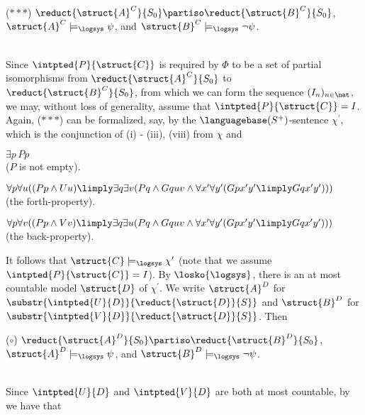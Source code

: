 \begin{enumerate}[1.]
\smallskip\\
\begin{quoteno}{($\ast\ast\ast$)}
$\reduct{\struct{A}^C}{S_0} \partiso \reduct{\struct{B}^C}{S_0}$, $\struct{A}^C \models_\logsys \psi$, and $\struct{B}^C \models_\logsys \neg\psi$.
\end{quoteno}\smallskip\\
Since $\intpted{P}{\struct{C}}$ is required by $\Phi$ to be a set of partial isomorphisms from $\reduct{\struct{A}^C}{S_0}$ to $\reduct{\struct{B}^C}{S_0}$, from which we can form the sequence $(I_n)_{n \in \nat}$, we may, without loss of generality, assume that $\intpted{P}{\struct{C}} = I$.
\bigskip\\
Again, ($\ast\ast\ast$) can be formalized, say, by the $\languagebase(S^+)$-sentence $\chi^\prime$, which is the conjunction of (i) - (iii), (viii) from $\chi$ and
\begin{compactenum}[(i$^\prime$)]
\item $\exists p \, Pp$\\($P$ is not empty).
\item $\forall p \forall u ((Pp \land Uu) \limply \exists q \exists v (Pq \land Gquv \land \forall x^\prime \forall y^\prime (Gpx^\prime y^\prime \limply Gqx^\prime y^\prime)))$\\(the forth-property).
\item $\forall p \forall v ((Pp \land Vv) \limply \exists q \exists u (Pq \land Gquv \land \forall x^\prime \forall y^\prime (Gpx^\prime y^\prime \limply Gqx^\prime y^\prime)))$\\(the back-property).
\end{compactenum}
It follows that $\struct{C} \models_\logsys \chi^\prime$ (note that we assume $\intpted{P}{\struct{C}} = I$). By $\losko{\logsys}$, there is an at most countable model $\struct{D}$ of $\chi^\prime$. We write $\struct{A}^D$ for $\substr{\intpted{U}{D}}{\reduct{\struct{D}}{S}}$ and $\struct{B}^D$ for $\substr{\intpted{V}{D}}{\reduct{\struct{D}}{S}}$. Then\smallskip\\
\begin{quoteno}{($\circ$)}
$\reduct{\struct{A}^D}{S_0} \partiso \reduct{\struct{B}^D}{S_0}$, $\struct{A}^D \models_\logsys \psi$, and $\struct{B}^D \models_\logsys \neg\psi$.
\end{quoteno}\smallskip\\
Since $\intpted{U}{D}$ and $\intpted{V}{D}$ are both at most countable, by  we have that\smallskip\\

\end{enumerate}
